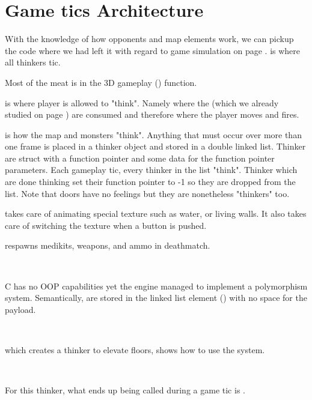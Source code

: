 \section{Game tics Architecture}
With the knowledge of how opponents and map elements work, we can pickup the code where we had left it with regard to game simulation on page \pageref{TryRunTics.c}.  is where all thinkers tic.\\
\par
{}
\par
Most of the meat is in the 3D gameplay () function.\\
\par
{}
\par
{} is where player is allowed to "think". Namely where the  (which we already studied on page \pageref{cmd_t_type}) are consumed and therefore where the player moves and fires.\\
\par 
{} is how the map and monsters "think". Anything that must occur over more than one frame is placed in a thinker object and stored in a double linked list. Thinker are struct with a function pointer and some data for the function pointer parameters. Each gameplay tic, every thinker in the list "think". Thinker which are done thinking set their function pointer to -1 so they are dropped from the list. Note that doors have no feelings but they are nonetheless "thinkers" too.\\
\par
{} takes care of animating special texture such as water, or living walls. It also takes care of switching the texture when a button is pushed.\\
\par 

  respawns medikits, weapons, and ammo in deathmatch.




\\
\par
C has no OOP capabilities yet the engine managed to implement a polymorphism system. Semantically,  are stored in the linked list element () with no space for the payload. \\%
\par
{}\\
\par
{} which creates a thinker to elevate floors, shows how to use the system.\\
\par
{}\\
\par
For this thinker, what ends up being called during a game tic is .
